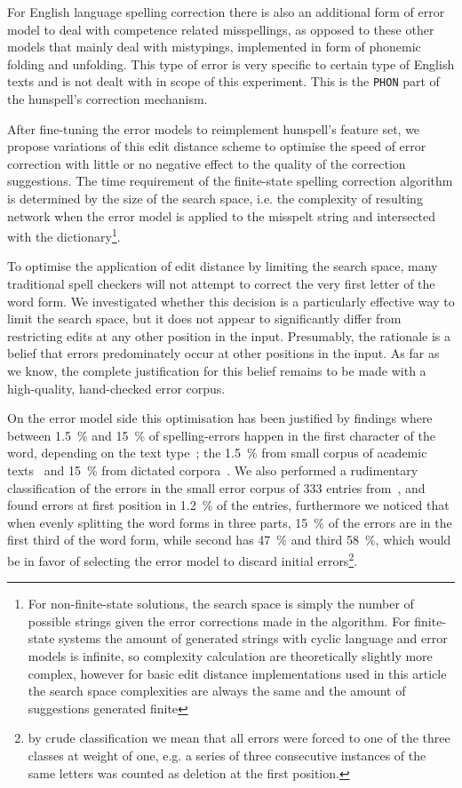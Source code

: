 \documentclass[11pt]{article}
\begin{document}
For English language spelling correction there is also an additional form of
error model to deal with competence related misspellings, as opposed to these
other models that mainly deal with mistypings, implemented in form of phonemic
folding and unfolding. This type of error is very specific to certain type of
English texts and is not dealt with in scope of this experiment. This is
the \texttt{PHON} part of the hunspell's correction mechanism.

After fine-tuning the error models to reimplement hunspell's feature set, we
propose variations of this edit distance scheme to optimise the
speed of error correction with little or no negative effect to the quality of
the correction suggestions. The time requirement of the
finite-state spelling correction algorithm is determined by the size of the
search space,
i.e. the complexity of resulting network when the error model is applied to the
misspelt string and intersected with the dictionary\footnote{For non-finite-state
solutions, the search space is simply the number of
possible strings given the error corrections made in the algorithm. For
finite-state systems the amount of generated strings with cyclic language and
error models is infinite, so complexity calculation are theoretically slightly
more complex, however for basic edit distance implementations used in this
article the search space complexities are always the same and the amount of
suggestions generated finite}.

To optimise the application of edit distance by limiting the search space, many
traditional spell checkers will not attempt to correct the very first letter of
the word form. We investigated whether this decision is a particularly
effective way to limit the search space, but it does not appear to
significantly differ from restricting edits at any other position in the input.
Presumably, the rationale is a belief that errors predominately occur at other
positions in the input. As far as we know, the complete justification for this
belief remains to be made with a high-quality, hand-checked error corpus.

On the error model side this optimisation has been justified by findings where
between 1.5~\% and 15~\% of spelling-errors happen in the first character of
the word, depending on the text type~\cite{Bhagat/2007};
the 1.5~\% from small corpus of academic texts~\cite{Yannakoudakis/1983}
and 15~\% from dictated corpora~\cite{Kukich/1992}. We also performed a
rudimentary classification of the errors in the small error corpus of
333 entries from~, and found errors at
first position in 1.2~\% of the entries, furthermore we noticed that
when evenly splitting the word forms in three parts, 15~\% of the errors are
in the first third of the word form, while second has 47~\% and third 58~\%,
which would be in favor of selecting the error model to discard initial
errors\footnote{by crude classification we mean that all errors were
forced to one of the three classes at weight of one, e.g. a series of
three consecutive instances of the same letters was counted as deletion at
the first position.}.
\end{document}

